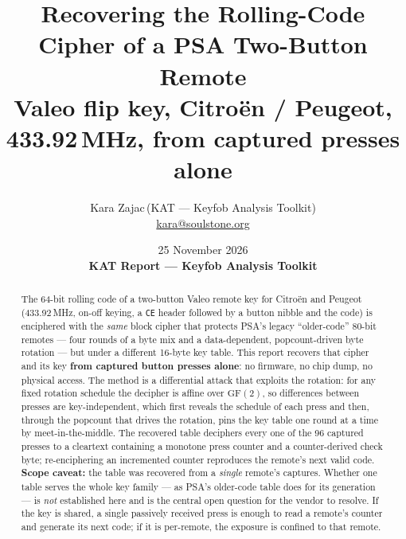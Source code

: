 \documentclass[11pt,a4paper]{article}
\title{Recovering the Rolling-Code Cipher of a PSA Two-Button Remote\\[2pt]
\large Valeo flip key, Citro\"en / Peugeot, 433.92\,MHz, from captured presses alone}
\author{Kara Zajac\,(KAT --- Keyfob Analysis Toolkit)\\[2pt]
\small \href{mailto:kara@soulstone.org}{kara@soulstone.org}}
\date{25 November 2026 \\[4pt] \small\textbf{KAT Report --- Keyfob Analysis Toolkit}}
\newcommand{\hex}[1]{\texttt{#1}}
\begin{document}
\maketitle

\begin{abstract}
The 64-bit rolling code of a two-button Valeo remote key for Citro\"en and Peugeot (433.92\,MHz, on-off keying, a \hex{CE} header followed by a button nibble and the code) is enciphered with the \emph{same} block cipher that protects PSA's legacy ``older-code'' 80-bit remotes --- four rounds of a byte mix and a data-dependent, popcount-driven byte rotation --- but under a different 16-byte key table. This report recovers that cipher and its key \textbf{from captured button presses alone}: no firmware, no chip dump, no physical access. The method is a differential attack that exploits the rotation: for any fixed rotation schedule the decipher is affine over $\mathrm{GF}(2)$, so differences between presses are key-independent, which first reveals the schedule of each press and then, through the popcount that drives the rotation, pins the key table one round at a time by meet-in-the-middle. The recovered table deciphers every one of the 96 captured presses to a cleartext containing a monotone press counter and a counter-derived check byte; re-enciphering an incremented counter reproduces the remote's next valid code. \textbf{Scope caveat:} the table was recovered from a \emph{single} remote's captures. Whether one table serves the whole key family --- as PSA's older-code table does for its generation --- is \emph{not} established here and is the central open question for the vendor to resolve. If the key is shared, a single passively received press is enough to read a remote's counter and generate its next code; if it is per-remote, the exposure is confined to that remote.
\end{abstract}
\end{document}
